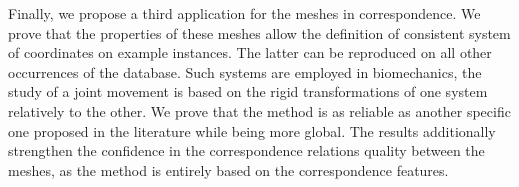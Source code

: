 Finally, we propose a third application for the meshes in correspondence. We prove that the properties of these meshes allow the definition of consistent system of coordinates on example instances. The latter can be reproduced on all other occurrences of the database. Such systems are employed in biomechanics, the study of a joint movement is based on the rigid transformations of one system relatively to the other. We prove that the method is as reliable as another specific one proposed in the literature while being more global. The results additionally strengthen the confidence in the correspondence relations quality between the meshes, as the method is entirely based on the correspondence features. 

%
%
